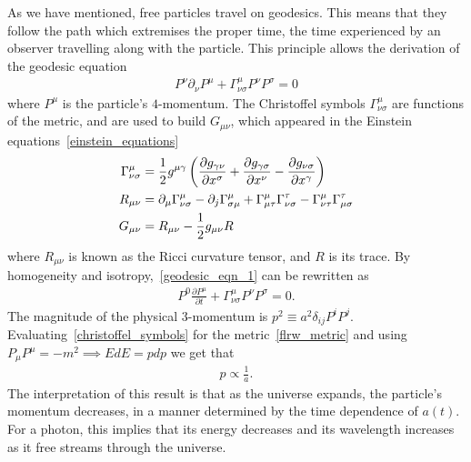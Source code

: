     As we have mentioned, free particles travel on geodesics.
    This means that they follow the path which extremises the proper time,
    the time experienced by an observer travelling along with the particle.
    This principle allows the derivation of
    the geodesic equation
    \begin{align}\label{geodesic_eqn_1}
        P^\nu\partial_\nu P^\mu+\Gamma^\mu_{\nu\sigma}P^\nu P^\sigma=0
    \end{align}
    where $P^\mu$ is the particle's $4$-momentum.
    The Christoffel symbols $\Gamma^\mu_{\nu\sigma}$ are functions of the
    metric, and are used to build $G_{\mu\nu}$, which appeared in the Einstein equations~\eqref{einstein_equations}
    \begin{align}
        \Gamma^\mu_{\nu\sigma} &= \frac{1}{2}g^{\mu\gamma}\left(
        \frac{\partial g_{\gamma\nu}}{\partial x^{\sigma}}
        +\frac{\partial g_{\gamma\sigma}}{\partial x^{\nu}}
        -\frac{\partial g_{\nu\sigma}}{\partial x^{\gamma}}
        \right)\label{christoffel_symbols}\\
        R_{\mu \nu} &= \partial_\mu \Gamma^\mu_{\nu \sigma}-\partial_j\Gamma^\mu_{\sigma\mu}+
        \Gamma^\mu_{\mu \tau}\Gamma^\tau_{\nu \sigma}-\Gamma^\mu_{\nu \tau}\Gamma^\tau_{\mu \sigma}\label{ricci_tensor}\\
        G_{\mu\nu} &= R_{\mu\nu} - \frac{1}{2}g_{\mu\nu}R\label{einstein_tensor}
    \end{align}
    where $R_{\mu \nu}$ is known as the Ricci curvature tensor, and $R$ is its trace.
    By homogeneity and isotropy,~\eqref{geodesic_eqn_1} can be rewritten as
    \begin{align}
        P^{0}\frac{\partial P^\mu}{\partial t}+\Gamma^\mu_{\nu\sigma}P^\nu P^\sigma=0.
    \end{align}
    The magnitude of the physical $3$-momentum is $p^2\equiv a^2\delta_{ij}P^i P^j$.
    Evaluating~\eqref{christoffel_symbols} for the metric~\eqref{flrw_metric}
    and using $P_\mu P^\mu=-m^2\implies EdE=pdp$
    we get that
    \begin{align}\label{eq:redshifting}
        p\propto \frac{1}{a}.
    \end{align}
    The interpretation of this result is that as the universe expands,
    the particle's momentum decreases, in a manner determined by the
    time dependence of $a(t)$.
    For a photon,
    this implies that its energy decreases and its wavelength increases
    as it free streams through the universe.


